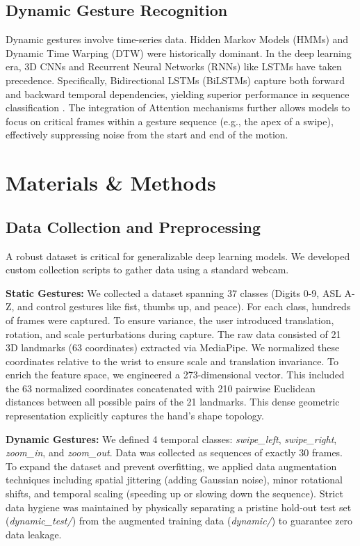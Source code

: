 \documentclass[10pt,twocolumn,letterpaper]{article}
\begin{document}
\subsection{Dynamic Gesture Recognition}
Dynamic gestures involve time-series data. Hidden Markov Models (HMMs) and Dynamic Time Warping (DTW) were historically dominant. In the deep learning era, 3D CNNs and Recurrent Neural Networks (RNNs) like LSTMs have taken precedence. Specifically, Bidirectional LSTMs (BiLSTMs) capture both forward and backward temporal dependencies, yielding superior performance in sequence classification \cite{Liu2017}. The integration of Attention mechanisms further allows models to focus on critical frames within a gesture sequence (e.g., the apex of a swipe), effectively suppressing noise from the start and end of the motion.

\section{Materials \& Methods}

\subsection{Data Collection and Preprocessing}
A robust dataset is critical for generalizable deep learning models. We developed custom collection scripts to gather data using a standard webcam.

\textbf{Static Gestures:} We collected a dataset spanning 37 classes (Digits 0-9, ASL A-Z, and control gestures like fist, thumbs up, and peace). For each class, hundreds of frames were captured. To ensure variance, the user introduced translation, rotation, and scale perturbations during capture.
The raw data consisted of 21 3D landmarks (63 coordinates) extracted via MediaPipe. We normalized these coordinates relative to the wrist to ensure scale and translation invariance. To enrich the feature space, we engineered a 273-dimensional vector. This included the 63 normalized coordinates concatenated with 210 pairwise Euclidean distances between all possible pairs of the 21 landmarks. This dense geometric representation explicitly captures the hand's shape topology.

\textbf{Dynamic Gestures:} We defined 4 temporal classes: \textit{swipe\_left}, \textit{swipe\_right}, \textit{zoom\_in}, and \textit{zoom\_out}. Data was collected as sequences of exactly 30 frames. To expand the dataset and prevent overfitting, we applied data augmentation techniques including spatial jittering (adding Gaussian noise), minor rotational shifts, and temporal scaling (speeding up or slowing down the sequence). Strict data hygiene was maintained by physically separating a pristine hold-out test set (\textit{dynamic\_test/}) from the augmented training data (\textit{dynamic/}) to guarantee zero data leakage.
\end{document}
